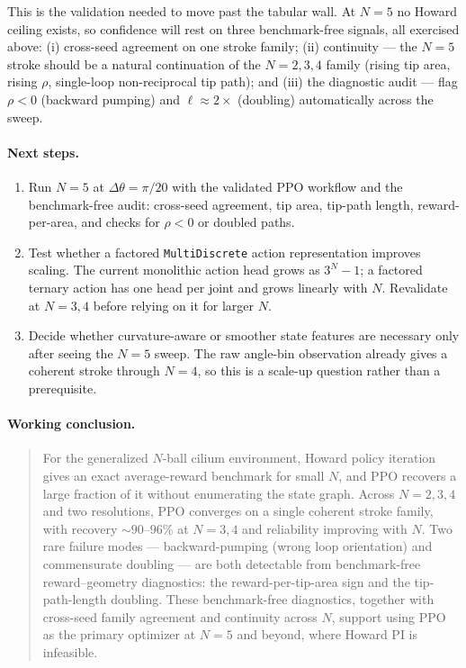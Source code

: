 \documentclass[11pt]{article}
\begin{document}
This is the validation needed to move past the tabular wall. At $N=5$ no Howard
ceiling exists, so confidence will rest on three benchmark-free signals, all
exercised above: (i) cross-seed agreement on one stroke family; (ii)
continuity --- the $N=5$ stroke should be a natural continuation of the
$N=2,3,4$ family (rising tip area, rising $\rho$, single-loop non-reciprocal
tip path); and (iii) the diagnostic audit --- flag $\rho<0$ (backward pumping)
and $\ell\approx2\times$ (doubling) automatically across the sweep.

\paragraph{Next steps.}
\begin{enumerate}[leftmargin=2em]
\item Run $N=5$ at $\Delta\theta=\pi/20$ with the validated PPO workflow and
the benchmark-free audit: cross-seed agreement, tip area, tip-path length,
reward-per-area, and checks for $\rho<0$ or doubled paths.

\item Test whether a factored \texttt{MultiDiscrete} action representation
improves scaling. The current monolithic action head grows as $3^N-1$; a
factored ternary action has one head per joint and grows linearly with $N$.
Revalidate at $N=3,4$ before relying on it for larger $N$.

\item Decide whether curvature-aware or smoother state features are necessary
only after seeing the $N=5$ sweep. The raw angle-bin observation already gives a
coherent stroke through $N=4$, so this is a scale-up question rather than a
prerequisite.
\end{enumerate}


\paragraph{Working conclusion.}
\begin{quote}
For the generalized $N$-ball cilium environment, Howard policy iteration\cite{howard1960} gives
an exact average-reward benchmark for small $N$, and PPO recovers a large
fraction of it without enumerating the state graph. Across $N=2,3,4$ and two
resolutions, PPO converges on a single coherent stroke family, with recovery
$\sim90$--$96\%$ at $N=3,4$ and reliability improving with $N$. Two rare failure
modes --- backward-pumping (wrong loop orientation) and commensurate doubling
--- are both detectable from benchmark-free reward--geometry diagnostics: the
reward-per-tip-area sign and the tip-path-length doubling. These benchmark-free diagnostics, together with
cross-seed family agreement and continuity across $N$, support using PPO as the
primary optimizer at $N=5$ and beyond, where Howard PI is infeasible.
\end{quote}



\end{document}
